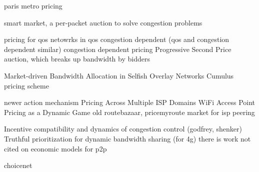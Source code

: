 paris metro pricing \cite{odlyzko99}

smart market, a per-packet auction to solve congestion problems

pricing for qos netowrks \cite{dasilva00, marbach04}
in qos congestion dependent (qos and congestion dependent similar) \cite{shu03}
congestion dependent pricing \cite{mason95, peha97, paschalidis00, la00, la02}
Progressive Second Price auction, which breaks up bandwidth by bidders  \cite{lazar98, lazar99, semret99, semret00,maille03, bitsaki05, beltran07}

Market-driven Bandwidth Allocation in Selfish Overlay Networks \cite{wang05}
Cumulus pricing scheme \cite{reichl01, stiller01cumulus, reichl01edgepricing, reichl03, hayel05}

newer action mechanism \cite{dramitinos07}
Pricing Across Multiple ISP Domains \cite{saberi07}
WiFi Access Point Pricing as a Dynamic Game \cite{musacchio06}
old routebazaar, pricemyroute \cite{esquivel09, pricemyroute11}
market for isp peering \cite{hau09}

Incentive compatibility and dynamics of congestion control (godfrey, shenker) \cite{godfrey10}
Truthful prioritization for dynamic bandwidth sharing (for 4g) \cite{shnayder14}
there is work not cited on economic models for p2p

choicenet \cite{wolf14}
